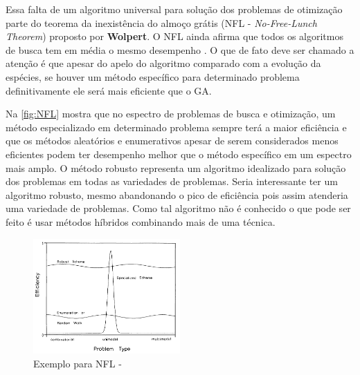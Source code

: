 Essa falta de um algoritmo universal para solução dos problemas de otimização parte do teorema da inexistência do almoço grátis (NFL - \textit{No-Free-Lunch Theorem}) proposto por \textbf{Wolpert}. O NFL ainda afirma que todos os algoritmos de busca tem em média o mesmo desempenho \cite{Linden2008}. O que de fato deve ser chamado a atenção é que apesar do apelo do algoritmo comparado com a evolução da espécies, se houver um método específico para determinado problema definitivamente ele será mais eficiente que o GA.

Na \autoref{fig:NFL} \citeauthor{Goldberg1989} mostra que no espectro de problemas de busca e otimização, um método especializado em determinado problema sempre terá a maior eficiência e que os métodos aleatórios e enumerativos apesar de serem considerados menos eficientes podem ter desempenho melhor que o método específico em um espectro mais amplo. O método robusto representa um algoritmo idealizado para solução dos problemas em todas as variedades de problemas. Seria interessante ter um algoritmo robusto, mesmo abandonando o pico de eficiência pois assim atenderia uma variedade de problemas. Como tal algoritmo não é conhecido o que pode ser feito é usar métodos híbridos combinando mais de uma técnica.

\begin{figure}[ht]
	\begin{center}
		\includegraphics[width=0.5\textwidth]{imagens/David_NFL_Theorem.png}
		\caption{Exemplo para NFL - \cite{Goldberg1989}}
		\label{fig:NFL}
	\end{center}
\end{figure}
